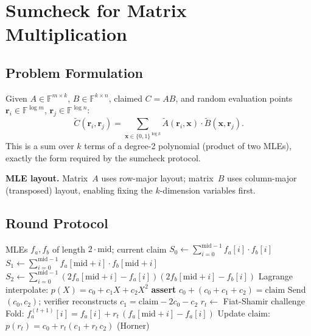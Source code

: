 \documentclass[10pt,twocolumn]{article}
\theoremstyle{definition}
\theoremstyle{remark}
\newcommand{\F}{\mathbb{F}}
\newcommand{\MLE}{\widetilde}
\begin{document}
\section{Sumcheck for Matrix Multiplication}\label{sec:sumcheck}

\subsection{Problem Formulation}

Given $A\in\F^{m\times k}$, $B\in\F^{k\times n}$, claimed $C=AB$,
and random evaluation points $\mathbf{r}_i\in\F^{\log m}$,
$\mathbf{r}_j\in\F^{\log n}$:
\begin{equation}\label{eq:matmul-sumcheck}
  \MLE{C}(\mathbf{r}_i,\mathbf{r}_j)
  = \sum_{\mathbf{x}\in\{0,1\}^{\log k}}
    \MLE{A}(\mathbf{r}_i,\mathbf{x})\cdot\MLE{B}(\mathbf{x},\mathbf{r}_j).
\end{equation}
This is a sum over $k$ terms of a degree-2 polynomial (product of two
MLEs), exactly the form required by the sumcheck protocol.

\textbf{MLE layout.}
Matrix~$A$ uses row-major layout; matrix~$B$ uses column-major
(transposed) layout, enabling fixing the $k$-dimension variables first.

\subsection{Round Protocol}

\begin{algorithm}[t]
\caption{Sumcheck round for MatMul verification}
\label{alg:sumcheck}
\begin{algorithmic}[1]
\Require MLEs $f_a, f_b$ of length $2\cdot\mathrm{mid}$; current claim
\State $S_0 \leftarrow \sum_{i=0}^{\mathrm{mid}-1} f_a[i] \cdot f_b[i]$
\State $S_1 \leftarrow \sum_{i=0}^{\mathrm{mid}-1}
  f_a[\mathrm{mid}+i] \cdot f_b[\mathrm{mid}+i]$
\State $S_2 \leftarrow \sum_{i=0}^{\mathrm{mid}-1}
  (2f_a[\mathrm{mid}+i] - f_a[i])
  (2f_b[\mathrm{mid}+i] - f_b[i])$
\State Lagrange interpolate: $p(X) = c_0 + c_1 X + c_2 X^2$
\State \textbf{assert} $c_0 + (c_0+c_1+c_2) = \text{claim}$
\State Send $(c_0, c_2)$; verifier reconstructs
  $c_1 = \text{claim} - 2c_0 - c_2$
\State $r_t \leftarrow$ Fiat-Shamir challenge
\State Fold: $f_a^{(t+1)}[i] = f_a[i] + r_t\,(f_a[\mathrm{mid}+i]-f_a[i])$
\State Update claim: $p(r_t) = c_0 + r_t(c_1 + r_t\,c_2)$ (Horner)
\end{algorithmic}
\end{algorithm}
\end{document}
